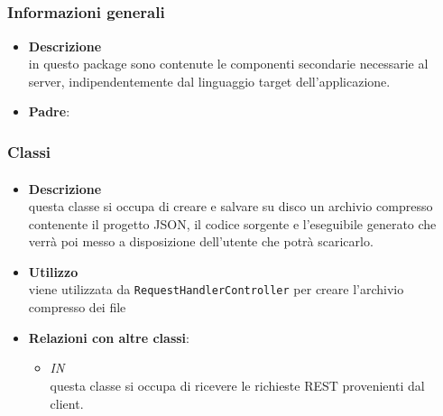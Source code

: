 \subsection{}
\label{\nogloxy{SWEDesigner::Server::Utility}}
\subsubsection{Informazioni generali}
\begin{itemize}
\item \textbf{Descrizione}\\
in questo package sono contenute le componenti secondarie necessarie al server, indipendentemente dal linguaggio target dell'applicazione.
\item \textbf{Padre}: \hyperref[\nogloxy{SWEDesigner::Server}]{}
\end{itemize}
\subsubsection{Classi}
\paragraph{}
\label{\nogloxy{SWEDesigner::Server::Utility::Compressor}}
\begin{itemize}
\item \textbf{Descrizione}\\
questa classe si occupa di creare e salvare su disco un archivio compresso contenente il progetto JSON, il codice sorgente e l'eseguibile generato che verrà poi messo a disposizione dell'utente che potrà scaricarlo.
\item \textbf{Utilizzo}\\
viene utilizzata da \texttt{RequestHandlerController} per creare l'archivio compresso dei file
\item \textbf{Relazioni con altre classi}:
\begin{itemize}
\item \textit{IN} \hyperref[\nogloxy{SWEDesigner::Server::Controller::RequestHandlerController}]{}\\
questa classe si occupa di ricevere le richieste REST provenienti dal client.
\end{itemize}
\end{itemize}
